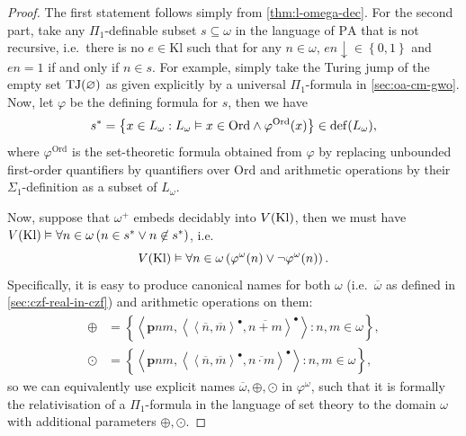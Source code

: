 \documentclass[12pt,openany]{book}
\theoremstyle{plain}
\theoremstyle{definition}
\newcommand\tuple[1]{\left\langle #1 \right\rangle}
\newcommand\opA[1]{\mathop{\forall #1}}
\DeclareMathOperator\TJ{TJ}
\DeclareMathOperator\dd{def}
\newcommand\PA{\mathrm{PA}}
\newcommand\Ord{\mathrm{Ord}}
\newcommand\Kl{\mathrm{Kl}}
\newcommand\bp{\mathbf{p}}
\begin{document}
\begin{proof}
  The first statement follows simply from \autoref{thm:l-omega-dec}. For the second part, take any $\Pi_1$-definable subset $s \subseteq \omega$ in the language of $\PA$ that is not recursive, i.e.\ there is no $e \in \Kl$ such that for any $n \in \omega$, $en {\downarrow} \in \left\{0, 1\right\}$ and $en = 1$ if and only if $n \in s$. For example, simply take the Turing jump of the empty set $\TJ\mleft(\varnothing\mright)$ as given explicitly by a universal $\Pi_1$-formula in \autoref{sec:oa-cm-gwo}. Now, let $\varphi$ be the defining formula for $s$, then we have
  \[s^* = \left\{x \in L_\omega : L_\omega \vDash x \in \Ord \land \varphi^\Ord\mleft(x\mright)\right\} \in \dd\mleft(L_\omega\mright),\]
  where $\varphi^\Ord$ is the set-theoretic formula obtained from $\varphi$ by replacing unbounded first-order quantifiers by quantifiers over $\Ord$ and arithmetic operations by their $\Sigma_1$-definition as a subset of $L_\omega$.

  Now, suppose that $\omega^+$ embeds decidably into $V\mleft(\Kl\mright)$, then we must have $V\mleft(\Kl\mright) \vDash \opA{n \in \omega} \left(n \in s^* \lor n \not\in s^*\right)$, i.e.
  \[V\mleft(\Kl\mright) \vDash \opA{n \in \omega} \left(\varphi^\omega\mleft(n\mright) \lor \neg \varphi^\omega\mleft(n\mright)\right).\]
  Specifically, it is easy to produce canonical names for both $\omega$ (i.e.\ $\overline{\omega}$ as defined in \autoref{sec:czf-real-in-czf}) and arithmetic operations on them:
  \begin{align*}
    \oplus & = \left\{\tuple{\bp nm, \tuple{\tuple{\overline{n}, \overline{m}}^\bullet, \overline{n + m}}^\bullet} : n, m \in \omega\right\},     \\
    \odot  & = \left\{\tuple{\bp nm, \tuple{\tuple{\overline{n}, \overline{m}}^\bullet, \overline{n \cdot m}}^\bullet} : n, m \in \omega\right\},
  \end{align*}
  so we can equivalently use explicit names $\overline{\omega}, \oplus, \odot$ in $\varphi^\omega$, such that it is formally the relativisation of a $\Pi_1$-formula in the language of set theory to the domain $\omega$ with additional parameters $\oplus, \odot$.


\end{proof}
\end{document}
